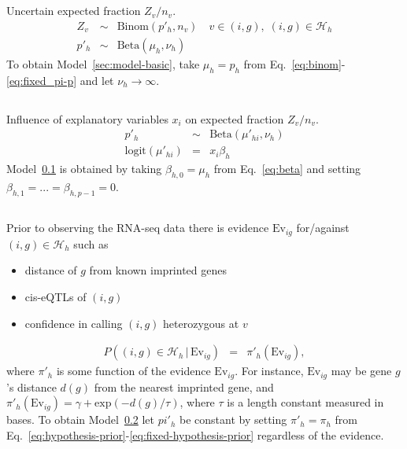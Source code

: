 \documentclass[letterpaper]{article}
\begin{document}
\subsection{}
\label{sec:model-beta}

Uncertain expected fraction \(Z_v/n_v\).
\begin{eqnarray}
Z_v &\sim& \mathrm{Binom}(p'_h, n_v) \quad v\in(i,g), \; (i,g)\in \mathcal{H}_h \\
\label{eq:beta}
p'_h &\sim& \mathrm{Beta}(\mu_h, \nu_h)
\end{eqnarray}
To obtain Model~\ref{sec:model-basic}, take \(\mu_h=p_h\) from
Eq.~\ref{eq:binom}-\ref{eq:fixed_pi-p} and let \(\nu_h \rightarrow \infty\).

\subsection{}
\label{sec:model-regression}

Influence of explanatory variables \(x_i\) on expected fraction \(Z_v/n_v\).
\begin{eqnarray}
p'_h &\sim& \mathrm{Beta}(\mu'_{hi}, \nu_h) \\
\mathrm{logit}(\mu'_{hi}) &=& x_i \beta_h
\end{eqnarray}
Model~\ref{sec:model-beta} is obtained by taking \(\beta_{h,0}=\mu_h\) from
Eq.~\ref{eq:beta} and
setting \(\beta_{h,1}=...=\beta_{h,p-1}=0\).

\subsection{}
\label{sec:prior-evidence}

Prior to observing the RNA-seq data there is evidence \(\mathrm{Ev}_{ig}\)
for/against \((i,g)\in \mathcal{H}_h\) such as
\begin{itemize}
\item distance of \(g\) from known imprinted genes
\item cis-eQTLs of \((i,g)\)
\item confidence in calling \((i,g)\) heterozygous at \(v\)
\end{itemize}

\begin{eqnarray}
P\left( (i,g) \in \mathcal{H}_h\, |\, \mathrm{Ev}_{ig} \right) &=&
\pi'_h(\mathrm{Ev}_{ig}),
\end{eqnarray}
where \(\pi'_h\) is some function of the evidence \(\mathrm{Ev}_{ig}\).  For
instance, \(\mathrm{Ev}_{ig}\) may be gene \(g\)'s distance \(d(g)\) from the
nearest imprinted gene, and \(\pi'_h(\mathrm{Ev}_{ig}) = \gamma +
\mathrm{exp}(- d(g) / \tau) \), where \(\tau\) is a length constant measured
in bases.  To obtain Model~\ref{sec:model-regression} let \(pi'_h\) be
constant  by setting \(\pi'_h = \pi_h\) from
Eq.~\ref{eq:hypothesis-prior}-\ref{eq:fixed-hypothesis-prior} regardless of
the evidence.
\end{document}
